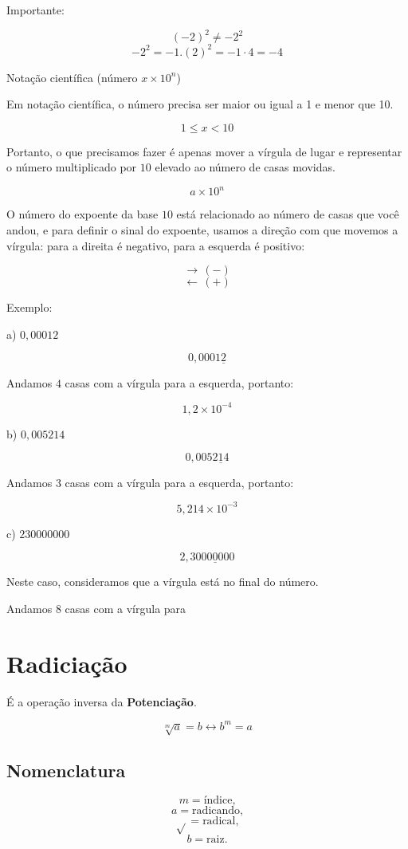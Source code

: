 \documentclass[letterpaper]{book}
\begin{document}
Importante:

\[
(-2)^{2} \neq -2^{2}
\]
\[
-2^{2} = -1.(2)^{2} = -1 \cdot 4 = -4
\]

Notação científica (número \(x \times 10^{n}\))

Em notação científica, o número precisa ser maior ou igual a 1 e menor que 10.

\[
1 \leq x < 10
\]

Portanto, o que precisamos fazer é apenas mover a vírgula de lugar e representar o número multiplicado por \(10\) elevado ao número de casas movidas.

\[
a \times 10^{n}
\]

O número do expoente da base \(10\) está relacionado ao número de casas que você andou, e para definir o sinal do expoente, usamos a direção com que movemos a vírgula: para a direita é negativo, para a esquerda é positivo:

\[
\rightarrow \, (-)
\]
\[
\leftarrow \, (+)
\]

Exemplo:

a) \(0,00012\)

\[
0,0001\underline{2}
\]

Andamos \(4\) casas com a vírgula para a esquerda, portanto:

\[
1,2 \times 10^{-4}
\]

b) \(0,005214\)

\[
0,005\underline{214}
\]

Andamos \(3\) casas com a vírgula para a esquerda, portanto:

\[
5,214 \times 10^{-3}
\]

c) \(230000000\)

\[
2,3\underline{0000000}
\]

Neste caso, consideramos que a vírgula está no final do número.

Andamos \(8\) casas com a vírgula para


\section{Radiciação}

É a operação inversa da \textbf{Potenciação}.

\[\sqrt[m]{a} = b \leftrightarrow b^{m} = a\]

\subsection{Nomenclatura}
\[m = \text{índice,}\]
\[a = \text{radicando,}\]
\[\sqrt{} = \text{radical,}\]
\[b = \text{raiz.}\]
\end{document}
